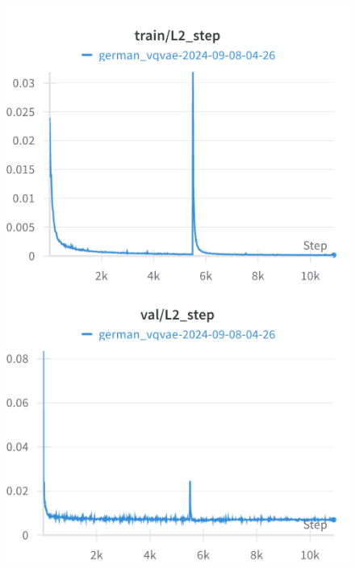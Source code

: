 \begin{figure}[H]
\includegraphics[width=\linewidth]{detailed_engineering/German VQVAE/charts/train_l2_step.png}
\caption{}
\endminipage\hfill
{}
\includegraphics[width=\linewidth]{detailed_engineering/German VQVAE/charts/val_l2_step.png}
\caption{}
\endminipage
\end{figure}

